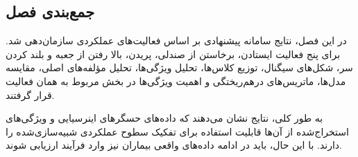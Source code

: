 \subsection{جمع‌بندی فصل}

در این فصل، نتایج سامانه پیشنهادی بر اساس فعالیت‌های عملکردی سازمان‌دهی شد. برای پنج فعالیت ایستادن، برخاستن از صندلی، پریدن، بالا رفتن از جعبه و بلند کردن سر، شکل‌های سیگنال، توزیع کلاس‌ها، تحلیل ویژگی‌ها، تحلیل مؤلفه‌های اصلی، مقایسه مدل‌ها، ماتریس‌های درهم‌ریختگی و اهمیت ویژگی‌ها در بخش مربوط به همان فعالیت قرار گرفتند.

به طور کلی، نتایج نشان می‌دهند که داده‌های حسگرهای اینرسیایی و ویژگی‌های استخراج‌شده از آن‌ها قابلیت استفاده برای تفکیک سطوح عملکردی شبیه‌سازی‌شده را دارند. با این حال، باید در ادامه داده‌های واقعی بیماران نیز وارد فرآیند ارزیابی شوند.
